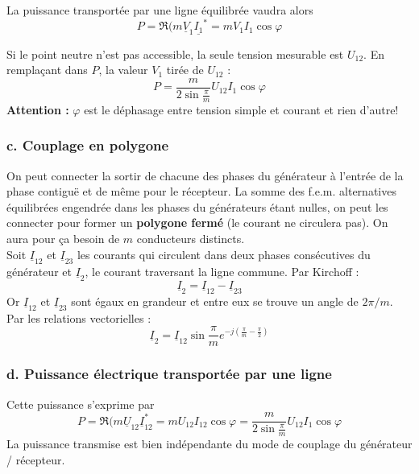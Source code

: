 		La puissance transportée par une ligne équilibrée vaudra alors 
		\begin{equation}
		P = \Re(m \underline{V}_1\underline{I_1}^* = mV_1I_1\cos\varphi
		\end{equation}
		
		Si le point neutre n'est pas accessible, la seule tension mesurable 
		est $U_{12}$. En remplaçant dans $P$, la valeur $V_1$ tirée de 
		$U_{12}$ :
		\begin{equation}
		P = \frac{m}{2\sin\frac{\pi}{m}}U_{12}I_1\cos\varphi
		\end{equation}
		\textbf{Attention :} $\varphi$ est le déphasage entre tension simple 
		et courant et rien d'autre!
		
		
		\subsubsection{c. Couplage en polygone}
		On peut connecter la sortir de chacune des phases du générateur à 
		l'entrée de la phase contiguë et de même pour le récepteur. La somme 
		des f.e.m. alternatives équilibrées engendrée dans les phases du 
		générateurs étant nulles, on peut les connecter pour former un 
		\textbf{polygone fermé} (le courant ne circulera pas). On aura pour ça
		besoin de $m$ conducteurs distincts.\\
		
		Soit $\underline{I}_{12}$ et $\underline{I}_{23}$ les courants qui 
		circulent dans deux phases consécutives du générateur et $\underline{I}_
		2$, le courant traversant la ligne commune. Par Kirchoff :
		\begin{equation}
		\underline{I}_2 = \underline{I}_{12}-\underline{I}_{23}
		\end{equation}
		Or $\underline{I}_{12}$ et $\underline{I}_{23}$  sont égaux en 
		grandeur et entre eux se trouve un angle de $2\pi/m$. Par les 
		relations vectorielles :
		\begin{equation}
		\underline{I}_2 = \underline{I}_{12}\sin\frac{\pi}{m}e^{-j\left(\frac{
		\pi}{m}-\frac{\pi}{2}\right)}
		\end{equation} 
		
		
		\subsubsection{d. Puissance électrique transportée par une ligne}
		Cette puissance s'exprime par 
		\begin{equation}
		P = \Re(m\underline{U}_{12}\underline{I}_{12}^* = mU_{12}I_{12}\cos
		\varphi = \frac{m}{2\sin\frac{\pi}{m}}U_{12}I_1\cos\varphi
		\end{equation}
		La puissance transmise est bien indépendante du mode de couplage du 
		générateur / récepteur.